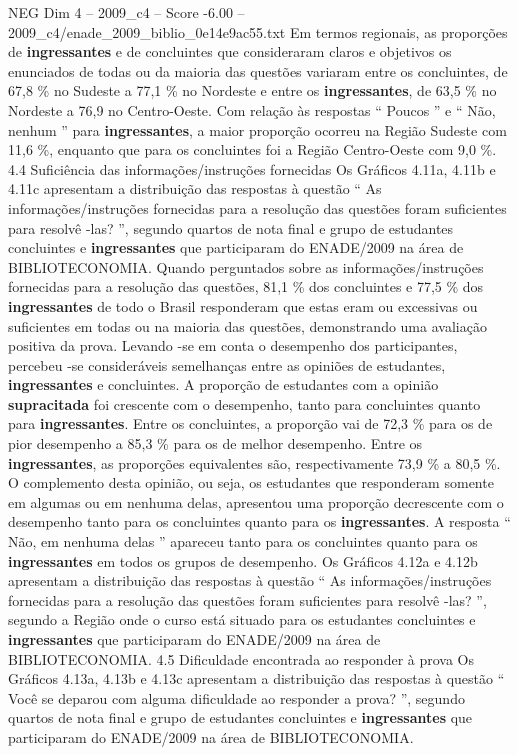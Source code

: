 \begin{textsample}{NEG Dim 4 – 2009\_c4 – Score -6.00 – 2009\_c4/enade\_2009\_biblio\_0e14e9ac55.txt}
Em termos regionais, as proporções de \textbf{ingressantes} e de concluintes que consideraram claros e objetivos os enunciados de todas ou da maioria das questões variaram entre os concluintes, de 67,8 \% no Sudeste a 77,1 \% no Nordeste e entre os \textbf{ingressantes}, de 63,5 \% no Nordeste a 76,9 no Centro-Oeste.
Com relação às respostas “ Poucos ” e “ Não, nenhum ” para \textbf{ingressantes}, a maior proporção ocorreu na Região Sudeste com 11,6 \%, enquanto que para os concluintes foi a Região Centro-Oeste com 9,0 \%. 4.4 Suficiência das informações/instruções fornecidas Os Gráficos 4.11a, 4.11b e 4.11c apresentam a distribuição das respostas à questão “ As informações/instruções fornecidas para a resolução das questões foram suficientes para resolvê -las? ”, segundo quartos de nota final e grupo de estudantes concluintes e \textbf{ingressantes} que participaram do ENADE/2009 na área de BIBLIOTECONOMIA.
Quando perguntados sobre as informações/instruções fornecidas para a resolução das questões, 81,1 \% dos concluintes e 77,5 \% dos \textbf{ingressantes} de todo o Brasil responderam que estas eram ou excessivas ou suficientes em todas ou na maioria das questões, demonstrando uma avaliação positiva da prova.
Levando -se em conta o desempenho dos participantes, percebeu -se consideráveis semelhanças entre as opiniões de estudantes, \textbf{ingressantes} e concluintes.
A proporção de estudantes com a opinião \textbf{supracitada} foi crescente com o desempenho, tanto para concluintes quanto para \textbf{ingressantes}.
Entre os concluintes, a proporção vai de 72,3 \% para os de pior desempenho a 85,3 \% para os de melhor desempenho.
Entre os \textbf{ingressantes}, as proporções equivalentes são, respectivamente 73,9 \% a 80,5 \%.
O complemento desta opinião, ou seja, os estudantes que responderam somente em algumas ou em nenhuma delas, apresentou uma proporção decrescente com o desempenho tanto para os concluintes quanto para os \textbf{ingressantes}.
A resposta “ Não, em nenhuma delas ” apareceu tanto para os concluintes quanto para os \textbf{ingressantes} em todos os grupos de desempenho.
Os Gráficos 4.12a e 4.12b apresentam a distribuição das respostas à questão “ As informações/instruções fornecidas para a resolução das questões foram suficientes para resolvê -las? ”, segundo a Região onde o curso está situado para os estudantes concluintes e \textbf{ingressantes} que participaram do ENADE/2009 na área de BIBLIOTECONOMIA. 4.5 Dificuldade encontrada ao responder à prova Os Gráficos 4.13a, 4.13b e 4.13c apresentam a distribuição das respostas à questão “ Você se deparou com alguma dificuldade ao responder a prova? ”, segundo quartos de nota final e grupo de estudantes concluintes e \textbf{ingressantes} que participaram do ENADE/2009 na área de BIBLIOTECONOMIA.

\end{textsample}
